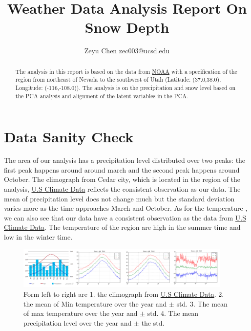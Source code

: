 \documentclass[a4paper]{article}
\title{Weather Data Analysis Report On Snow Depth}
\author{Zeyu Chen zec003@ucsd.edu}
\begin{document}
\maketitle

\begin{abstract}
The analysis in this report is based on the data from \href{https://www.ncdc.noaa.gov}{NOAA} with a specification of the region from northeast of Nevada to the southwest of Utah (Latitude: (37.0,38.0), Longitude: (-116,-108.0)). The analysis is on the precipitation and snow level based on the PCA analysis and alignment of the latent variables in the PCA.  
\end{abstract}

\section{Data Sanity Check}
The area of our analysis has a precipitation level distributed over two peaks: the first peak happens around around march and the second peak happens around October. The climograph from Cedar city, which is located in the region of the analysis, \href{http://www.usclimatedata.com/climate/cedar-city/utah/united-states/usut0038}{U.S Climate Data} reflects the consistent observation as our data.  The mean of precipitation level does not change much but the standard deviation varies more as the time approaches March and October.
As for the temperature , we can also see that  our data have a consistent observation as the data from  \href{http://www.usclimatedata.com/climate/cedar-city/utah/united-states/usut0038}{U.S Climate Data}. The temperature of the region are high in the summer time and low in the winter time.
\begin{figure}[!htp]
\centering
\includegraphics[width=0.95\textwidth]{sanity.png}
\caption{\label{fig:sanity}Form left to right are 1. the climograph from \href{http://www.usclimatedata.com/climate/cedar-city/utah/united-states/usut0038}{U.S Climate Data}. 2. the mean of Min temperature over the year and $\pm$ std. 3. The mean of max temperature over the year and $\pm$ std. 4. The mean precipitation level over the year and $\pm$ the std.}
\end{figure}
\end{document}
